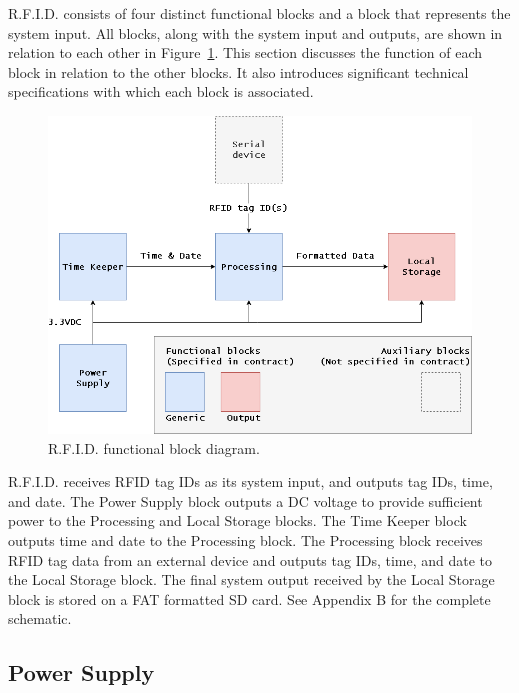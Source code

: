 R.F.I.D. consists of four distinct functional blocks and a block that represents the system input. All blocks, along with the system input and outputs, are shown in relation to each other in Figure~\ref{fig:functional_diagram}. This section discusses the function of each block in relation to the other blocks. It also introduces significant technical specifications with which each block is associated.

\begin{figure}[H]
    \centering
    \includegraphics[width=1\textwidth]{Figures/3_breakdown/FBD.png}
    \caption{R.F.I.D. functional block diagram.}
    \label{fig:functional_diagram}
\end{figure}



R.F.I.D. receives RFID tag IDs as its system input, and outputs tag IDs, time, and date. The Power Supply block outputs a DC voltage to provide sufficient power to the Processing and Local Storage blocks. The Time Keeper block outputs time and date to the Processing block. The Processing block receives RFID tag data from an external device and outputs tag IDs, time, and date to the Local Storage block. The final system output received by the Local Storage block is stored on a FAT formatted SD card. See Appendix B for the complete schematic.


\subsection{Power Supply}

